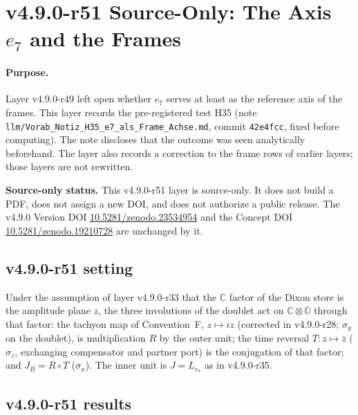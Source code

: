\clearpage
\section*{v4.9.0-r51 Source-Only: The Axis \texorpdfstring{\(e_7\)}{e7} and the Frames}
\label{sec:v490-r51-e7-frames}

\paragraph{Purpose.}
Layer v4.9.0-r49 left open whether \(e_7\) serves at least as the reference axis of the frames.  This layer records the pre-registered test
H35 (note \texttt{llm/Vorab\_Notiz\_H35\_e7\_als\_Frame\_Achse.md}, commit \texttt{42e4fcc}, fixed before computing).  The note discloses that the
outcome was seen analytically beforehand.  The layer also records a correction to the frame rows of earlier layers; those layers are not
rewritten.

\noindent\textbf{Source-only status.}
This v4.9.0-r51 layer is source-only.  It does not build a PDF, does not assign a new DOI,
and does not authorize a public release.  The v4.9.0 Version DOI
\href{https://doi.org/10.5281/zenodo.23534954}{10.5281/zenodo.23534954} and the Concept DOI
\href{https://doi.org/10.5281/zenodo.19210728}{10.5281/zenodo.19210728} are unchanged by it.

\subsection*{v4.9.0-r51 setting}
\label{subsec:v490-r51-setting}

Under the assumption of layer v4.9.0-r33 that the \(\mathbb C\) factor of the Dixon store is the amplitude plane \(z\), the three
involutions of the doublet act on \(\mathbb C\otimes\mathbb O\) through that factor: the tachyon map of Convention~F, \(z\mapsto iz\)
(corrected in v4.9.0-r28; \(\sigma_y\) on the doublet), is multiplication \(R\) by the outer unit; the time reversal \(T\colon z\mapsto\bar z\)
(\(\sigma_z\), exchanging compensator and partner port) is the conjugation of that factor; and \(J_B=R\circ T\) (\(\sigma_x\)).  The inner unit is
\(J=L_{e_7}\) as in v4.9.0-r35.

\subsection*{v4.9.0-r51 results}
\label{subsec:v490-r51-results}


